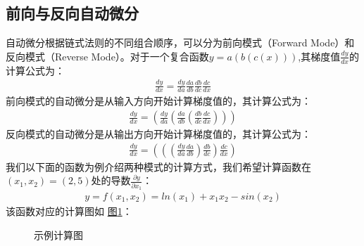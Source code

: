 \documentclass[letterpaper,10pt,english]{sphinxmanual}
\let\sphinxpxdimen\pdfpxdimen\else\newdimen\sphinxpxdimen
\begin{document}
\subsection{前向与反向自动微分}
\label{\detokenize{chapter_frontend_and_ir/ad:id9}}
\sphinxAtStartPar
自动微分根据链式法则的不同组合顺序，可以分为前向模式（Forward
Mode）和反向模式（Reverse
Mode）。对于一个复合函数\(y=a(b(c(x)))\),其梯度值\(\frac{dy}{dx}\)的计算公式为：
\begin{equation}\label{equation:chapter_frontend_and_ir/ad:chapter_frontend_and_ir/ad:3}
\begin{split}\frac{dy}{dx}=\frac{dy}{da}\frac{da}{db}\frac{db}{dc}\frac{dc}{dx}\end{split}
\end{equation}
\sphinxAtStartPar
前向模式的自动微分是从输入方向开始计算梯度值的，其计算公式为：
\begin{equation}\label{equation:chapter_frontend_and_ir/ad:chapter_frontend_and_ir/ad:4}
\begin{split}\frac{dy}{dx}=(\frac{dy}{da}(\frac{da}{db}(\frac{db}{dc}\frac{dc}{dx})))\end{split}
\end{equation}
\sphinxAtStartPar
反向模式的自动微分是从输出方向开始计算梯度值的，其计算公式为：
\begin{equation}\label{equation:chapter_frontend_and_ir/ad:chapter_frontend_and_ir/ad:5}
\begin{split}\frac{dy}{dx}=(((\frac{dy}{da}\frac{da}{db})\frac{db}{dc})\frac{dc}{dx})\end{split}
\end{equation}
\sphinxAtStartPar
我们以下面的函数为例介绍两种模式的计算方式，我们希望计算函数在\((x_1, x_2)=(2,5)\)处的导数\(\frac{\partial y}{\partial x_1}\)：
\begin{equation}\label{equation:chapter_frontend_and_ir/ad:chapter_frontend_and_ir/ad:6}
\begin{split}y=f(x_1,x_2)=ln(x_1)+{x_1}{x_2}-sin(x_2)\end{split}
\end{equation}
\sphinxAtStartPar
该函数对应的计算图如 \hyperref[\detokenize{chapter_frontend_and_ir/ad:example-compute-graph}]{图\ref{\detokenize{chapter_frontend_and_ir/ad:example-compute-graph}}}：

\begin{figure}[H]
\centering
\capstart

\noindent\sphinxincludegraphics[width=800\sphinxpxdimen]{{自动微分-示例计算图}.svg}
\caption{示例计算图}\label{\detokenize{chapter_frontend_and_ir/ad:id16}}\label{\detokenize{chapter_frontend_and_ir/ad:example-compute-graph}}\end{figure}
\end{document}
